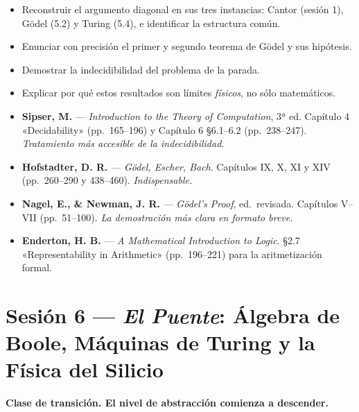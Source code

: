 \documentclass[11pt, letterpaper]{article}
\begin{document}
\begin{objetivos}
\begin{itemize}
  \item Reconstruir el argumento diagonal en sus tres instancias: Cantor (sesión 1), Gödel (5.2) y Turing (5.4), e identificar la estructura común.
  \item Enunciar con precisión el primer y segundo teorema de Gödel y sus hipótesis.
  \item Demostrar la indecidibilidad del problema de la parada.
  \item Explicar por qué estos resultados son límites \emph{físicos}, no sólo matemáticos.
\end{itemize}
\end{objetivos}

\begin{lecturas}
\begin{itemize}
  \item[$(\star)$] \textbf{Sipser, M.} — \emph{Introduction to the Theory of Computation}, 3ª ed. Capítulo 4 «Decidability» (pp.\ 165--196) y Capítulo 6 §6.1--6.2 (pp.\ 238--247). \textit{Tratamiento más accesible de la indecidibilidad.}
  \item[$(\star)$] \textbf{Hofstadter, D. R.} — \emph{Gödel, Escher, Bach}. Capítulos IX, X, XI y XIV (pp.\ 260--290 y 438--460). \textit{Indispensable.}
  \item \textbf{Nagel, E., \& Newman, J. R.} — \emph{Gödel's Proof}, ed.\ revisada. Capítulos V--VII (pp.\ 51--100). \textit{La demostración más clara en formato breve.}
  \item \textbf{Enderton, H. B.} — \emph{A Mathematical Introduction to Logic}. §2.7 «Representability in Arithmetic» (pp.\ 196--221) para la aritmetización formal.
\end{itemize}
\end{lecturas}

\newpage

\section{Sesión 6 — \textit{El Puente}: Álgebra de Boole, Máquinas de Turing y la Física del Silicio}

\textcolor{mitred}{\textbf{Clase de transición. El nivel de abstracción comienza a descender.}}
\end{document}
